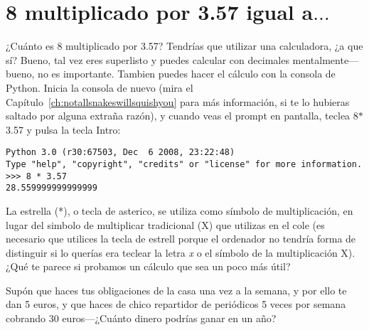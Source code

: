 

\chapter{8 multiplicado por 3.57 igual a$\ldots$}\label{ch:8multipliedby3.57}

¿Cuánto es 8 multiplicado por 3.57? Tendrías que utilizar una calculadora, ¿a que sí? Bueno, tal vez eres superlisto y puedes calcular con decimales mentalmente---bueno, no es importante.  Tambien puedes hacer el cálculo con la consola de Python. Inicia la consola de nuevo (mira el Capítulo~\ref{ch:notallsnakeswillsquishyou} para más información, si te lo hubieras saltado por alguna extraña razón), y cuando veas el prompt en pantalla, teclea 8$*$3.57 y pulsa la tecla Intro:

\begin{listing}
\begin{verbatim}
Python 3.0 (r30:67503, Dec  6 2008, 23:22:48) 
Type "help", "copyright", "credits" or "license" for more information.
>>> 8 * 3.57
28.559999999999999
\end{verbatim}
\end{listing}

La estrella (*), o tecla de asterico, se utiliza como símbolo de multiplicación, en lugar del simbolo de multiplicar tradicional (\textsf{X}) que utilizas en el cole (es necesario que utilices la tecla de estrell porque el ordenador no tendría forma de distinguir si lo querías era teclear la letra \emph{x} o el símbolo de la multiplicación \textsf{X}).  ¿Qué te parece si probamos un cálculo que sea un poco más útil?

Supón que haces tus obligaciones de la casa una vez a la semana, y por ello te dan 5 euros, y que haces de chico repartidor de periódicos 5 veces por semana cobrando 30 euros---¿Cuánto dinero podrías ganar en un año?

